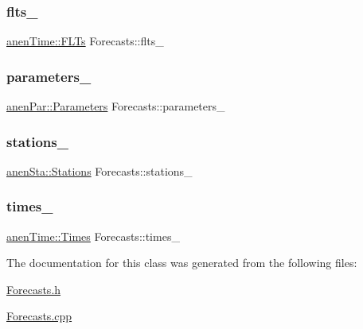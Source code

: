 \subsubsection{\texorpdfstring{flts\+\_\+}{flts\_}}
{\footnotesize\ttfamily \mbox{\hyperlink{classanen_time_1_1_f_l_ts}{anen\+Time\+::\+F\+L\+Ts}} Forecasts\+::flts\+\_\+\hspace{0.3cm}{\ttfamily [protected]}}

\mbox{\label{class_forecasts_a514e1029a27c9d797212158238e4ec86}} 
\subsubsection{\texorpdfstring{parameters\+\_\+}{parameters\_}}
{\footnotesize\ttfamily \mbox{\hyperlink{classanen_par_1_1_parameters}{anen\+Par\+::\+Parameters}} Forecasts\+::parameters\+\_\+\hspace{0.3cm}{\ttfamily [protected]}}

\mbox{\label{class_forecasts_ac86fcc7d20b581d87a32eac26a5f8b01}} 
\subsubsection{\texorpdfstring{stations\+\_\+}{stations\_}}
{\footnotesize\ttfamily \mbox{\hyperlink{classanen_sta_1_1_stations}{anen\+Sta\+::\+Stations}} Forecasts\+::stations\+\_\+\hspace{0.3cm}{\ttfamily [protected]}}

\mbox{\label{class_forecasts_a5db6d70382b21bc6621b7765d21f6d61}} 
\subsubsection{\texorpdfstring{times\+\_\+}{times\_}}
{\footnotesize\ttfamily \mbox{\hyperlink{classanen_time_1_1_times}{anen\+Time\+::\+Times}} Forecasts\+::times\+\_\+\hspace{0.3cm}{\ttfamily [protected]}}



The documentation for this class was generated from the following files\+:\begin{DoxyCompactItemize}
\item 
\mbox{\hyperlink{_forecasts_8h}{Forecasts.\+h}}\item 
\mbox{\hyperlink{_forecasts_8cpp}{Forecasts.\+cpp}}\end{DoxyCompactItemize}
